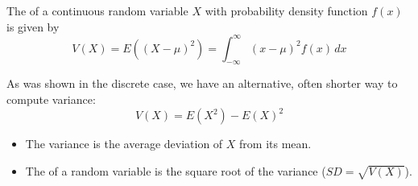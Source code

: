 \begin{definition}[Variance]
    The  of a continuous random variable $X$ with probability density function $f(x)$ is given by $$V(X) = E((X - \mu)^2) = \int_{-\infty}^\infty (x - \mu)^2 f(x) \,dx$$ 

    As was shown in the discrete case, we have an alternative, often shorter way to compute variance: $$V(X) = E(X^2) - E(X)^2$$
\end{definition}

\begin{itemize}
    \item The variance is the average  deviation of $X$ from its mean.
    \item The  of a random variable is the square root of the variance ($SD = \sqrt{V(X)}$).
\end{itemize}

